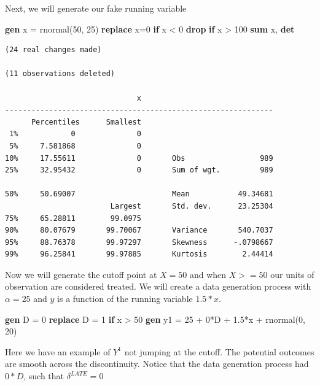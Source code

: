 \documentclass[
]{book}
\newenvironment{Shaded}{\begin{snugshade}}{\end{snugshade}}
\newcommand{\FunctionTok}[1]{\textcolor[rgb]{0.13,0.29,0.53}{\textbf{#1}}}
\newcommand{\KeywordTok}[1]{\textcolor[rgb]{0.13,0.29,0.53}{\textbf{#1}}}
\newcommand{\NormalTok}[1]{#1}
\begin{document}
Next, we will generate our fake running variable

\begin{Shaded}
\begin{Highlighting}[]
\KeywordTok{gen}\NormalTok{ x = rnormal(50, 25)}
\KeywordTok{replace}\NormalTok{ x=0 }\KeywordTok{if}\NormalTok{ x \textless{} 0}
\KeywordTok{drop} \KeywordTok{if}\NormalTok{ x \textgreater{} 100}
\KeywordTok{sum}\NormalTok{ x, }\FunctionTok{det}
\end{Highlighting}
\end{Shaded}

\begin{verbatim}
(24 real changes made)

(11 observations deleted)

                              x
-------------------------------------------------------------
      Percentiles      Smallest
 1%            0              0
 5%     7.581868              0
10%     17.55611              0       Obs                 989
25%     32.95432              0       Sum of wgt.         989

50%     50.69007                      Mean           49.34681
                        Largest       Std. dev.      23.25304
75%     65.28811        99.0975
90%     80.07679       99.70067       Variance       540.7037
95%     88.76378       99.97297       Skewness      -.0798667
99%     96.25841       99.97885       Kurtosis        2.44414
\end{verbatim}

Now we will generate the cutoff point at \(X=50\) and when \(X >= 50\) our units of observation are considered treated. We will create a data generation process with \(\alpha=25\) and \(y\) is a function of the running variable \(1.5*x\).

\begin{Shaded}
\begin{Highlighting}[]
\KeywordTok{gen}\NormalTok{ D = 0}
\KeywordTok{replace}\NormalTok{ D = 1 }\KeywordTok{if}\NormalTok{ x \textgreater{} 50}
\KeywordTok{gen}\NormalTok{ y1 = 25 + 0*D + 1.5*x + rnormal(0, 20)}
\end{Highlighting}
\end{Shaded}

Here we have an example of \(Y^1\) not jumping at the cutoff. The potential outcomes are smooth across the discontinuity. Notice that the data generation process had \(0*D\), such that \(\delta^{LATE}=0\)
\end{document}
